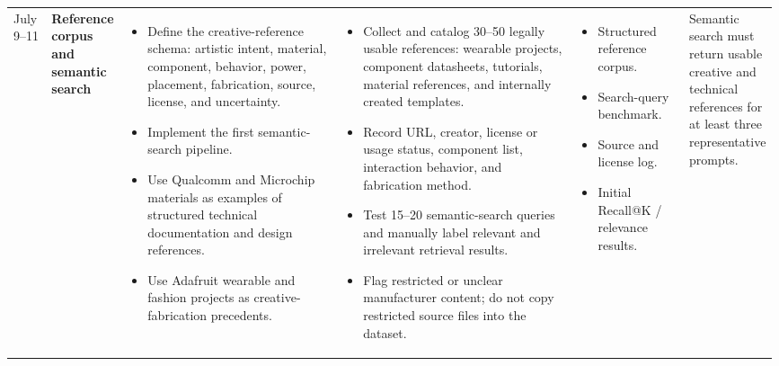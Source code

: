 \documentclass{article}
\begin{document}
\begin{landscape}
\begin{longtable}{
    L{0.05\linewidth}
    L{0.08\linewidth}
    L{0.3\linewidth}
    L{0.33\linewidth}
    L{0.15\linewidth}
    L{0.08\linewidth}
}
July 9--11
&
\textbf{Reference corpus and semantic search}
&
\begin{itemize}[leftmargin=*,nosep]
    \item Define the creative-reference schema:
    artistic intent, material, component, behavior, power,
    placement, fabrication, source, license, and uncertainty.
    \item Implement the first semantic-search pipeline.
    \item Use Qualcomm and Microchip materials as examples of
    structured technical documentation and design references.
    \item Use Adafruit wearable and fashion projects as
    creative-fabrication precedents.
\end{itemize}
&
\begin{itemize}[leftmargin=*,nosep]
    \item Collect and catalog 30--50 legally usable references:
    wearable projects, component datasheets, tutorials,
    material references, and internally created templates.
    \item Record URL, creator, license or usage status,
    component list, interaction behavior, and fabrication method.
    \item Test 15--20 semantic-search queries and manually label
    relevant and irrelevant retrieval results.
    \item Flag restricted or unclear manufacturer content;
    do not copy restricted source files into the dataset.
\end{itemize}
&
\begin{itemize}[leftmargin=*,nosep]
    \item Structured reference corpus.
    \item Search-query benchmark.
    \item Source and license log.
    \item Initial Recall@K / relevance results.
\end{itemize}
&
Semantic search must return usable creative and technical references
for at least three representative prompts.
\\


\end{longtable}
\end{landscape}
\end{document}
